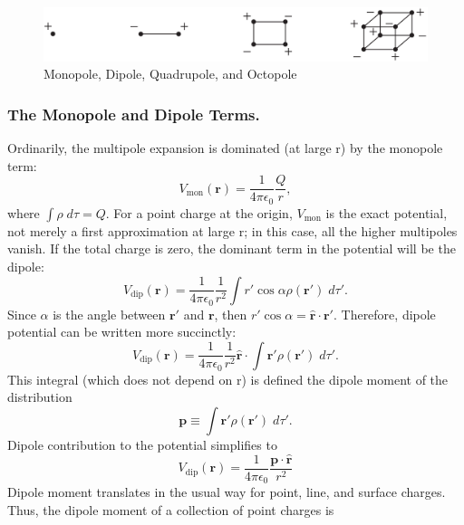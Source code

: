 \documentclass[../../../main.tex]{subfiles}
\begin{document}
\begin{figure}
    \centering
    \includegraphics[width=\textwidth]{../Rss/Electromagnetism/Potential/MultiPoleHierarchy.png}
    \caption*{Monopole, Dipole, Quadrupole, and Octopole}
\end{figure}

\subsubsection*{The Monopole and Dipole Terms.} Ordinarily, the multipole expansion is dominated (at large r) by the monopole
term:
\begin{equation*}
     V_{\text{mon}}(\mathbf{r})=\frac{1}{4\pi \epsilon_0}\frac{Q}{r},
\end{equation*}
where $\int\rho\; d\tau=Q$. For a point charge at the origin, $ V_{\text{mon}}$ is the exact potential, not merely a first approximation at large r; in this case, all the higher multipoles vanish. If the total charge is zero, the dominant term in the potential will be the dipole:
\begin{equation*}
     V_{\text{dip}}(\mathbf{r})=\frac{1}{4\pi \epsilon_0}\frac{1}{r^2}\int r'\cos \alpha \rho(\mathbf{r}')\; d\tau'.
\end{equation*}
Since $\alpha$ is the angle between $\mathbf{r'}$ and $\mathbf{r}$, then $r' \cos \alpha = \mathbf{\hat{r}} \cdot \mathbf{r'}$. Therefore, dipole potential can be written more succinctly:
\begin{equation*}
     V_{\text{dip}}(\mathbf{r})=\frac{1}{4\pi \epsilon_0}\frac{1}{r^2}\mathbf{\hat{r}}\cdot\int \mathbf{r'} \rho(\mathbf{r}')\; d\tau'.
\end{equation*}
This integral (which does not depend on r) is defined the dipole moment of the distribution
\begin{equation*}
    \mathbf{p}\equiv \int\mathbf{r'} \rho(\mathbf{r}')\; d\tau'.
\end{equation*}
Dipole contribution to the potential simplifies to
\begin{equation*}
     V_{\text{dip}}(\mathbf{r})=\frac{1}{4\pi \epsilon_0}\frac{\mathbf{p}\cdot \mathbf{\hat{r}}}{r^2}
\end{equation*}
Dipole moment translates in the usual way for point, line, and surface charges. Thus, the dipole moment of a collection of point charges is
\end{document}
